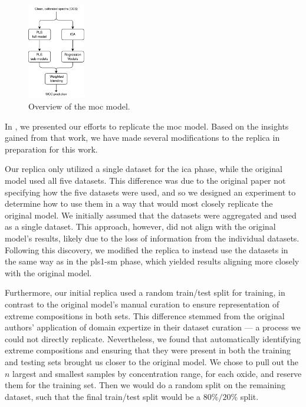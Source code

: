 \begin{figure}
	\centering
	\includegraphics[width=0.225\textwidth]{images/moc_pipeline.pdf}
	\caption{Overview of the \gls{moc} model.}
	\label{fig:moc_pipeline}
\end{figure}

In \citet{p9_paper}, we presented our efforts to replicate the \gls{moc} model.
Based on the insights gained from that work, we have made several modifications to the replica in preparation for this work.

Our replica only utilized a single dataset for the \gls{ica} phase, while the original model used all five datasets.
This difference was due to the original paper not specifying how the five datasets were used, and so we designed an experiment to determine how to use them in a way that would most closely replicate the original model.
We initially assumed that the datasets were aggregated and used as a single dataset.
This approach, however, did not align with the original model's results, likely due to the loss of information from the individual datasets.
Following this discovery, we modified the replica to instead use the datasets in the same way as in the \gls{pls1-sm} phase, which yielded results aligning more closely with the original model.

Furthermore, our initial replica used a random train/test split for training, in contrast to the original model's manual curation to ensure representation of extreme compositions in both sets.
This difference stemmed from the original authors' application of domain expertize in their dataset curation --- a process we could not directly replicate.
Nevertheless, we found that automatically identifying extreme compositions and ensuring that they were present in both the training and testing sets brought us closer to the original model.
We chose to pull out the $n$ largest and smallest samples by concentration range, for each oxide, and reserve them for the training set.
Then we would do a random split on the remaining dataset, such that the final train/test split would be a $80\%/20\%$ split.

